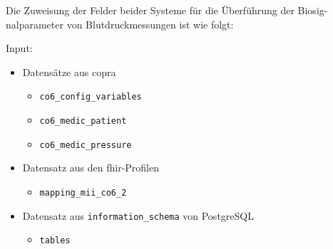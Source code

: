 Die Zuweisung der Felder beider Systeme für die Überführung der Biosig- nalparameter von Blutdruckmessungen ist wie folgt:
\vspace{4mm}

\noindent Input:
\begin{itemize}
	\item Datensätze aus \ac{copra}
	\begin{itemize}
		\item \texttt{co6\_config\_variables}
		\item \texttt{co6\_medic\_patient}
		\item \texttt{co6\_medic\_pressure} 
	\end{itemize}
	\item Datensatz aus den \ac{fhir}-Profilen
	\begin{itemize}
		\item \texttt{mapping\_mii\_co6\_2}
	\end{itemize}
	\item Datensatz aus \texttt{information\_schema} von PostgreSQL
	\begin{itemize}
		\item \texttt{tables}
	\end{itemize}
\end{itemize}

